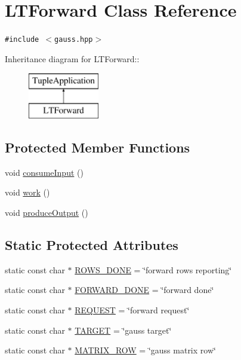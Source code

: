 \hypertarget{class_l_t_forward}{
\section{LTForward Class Reference}
\label{class_l_t_forward}
}
{\tt \#include $<$gauss.hpp$>$}

Inheritance diagram for LTForward::\begin{figure}[H]
\begin{center}
\leavevmode
\includegraphics[height=2cm]{class_l_t_forward}
\end{center}
\end{figure}
\subsection*{Protected Member Functions}
\begin{CompactItemize}
\item 
void \hyperlink{class_l_t_forward_6f3bbdf720e1899b0df8a8f222727086}{consumeInput} ()
\item 
void \hyperlink{class_l_t_forward_d98aff7a063bf6e8542046c6f2c097fa}{work} ()
\item 
void \hyperlink{class_l_t_forward_56c27cd419407319f95afa4e7d43409a}{produceOutput} ()
\end{CompactItemize}
\subsection*{Static Protected Attributes}
\begin{CompactItemize}
\item 
static const char $\ast$ \hyperlink{class_l_t_forward_52da5e0079361dc8daf8c6a9a976c98d}{ROWS\_\-DONE} = \char`\"{}forward rows reporting\char`\"{}
\item 
static const char $\ast$ \hyperlink{class_l_t_forward_f638f80e205c1c7dc14766015d1247e6}{FORWARD\_\-DONE} = \char`\"{}forward done\char`\"{}
\item 
static const char $\ast$ \hyperlink{class_l_t_forward_e5706fd083624c202c274015935c865b}{REQUEST} = \char`\"{}forward request\char`\"{}
\item 
static const char $\ast$ \hyperlink{class_l_t_forward_79ab5e95abdc47acc8150941a17fb54a}{TARGET} = \char`\"{}gauss target\char`\"{}
\item 
static const char $\ast$ \hyperlink{class_l_t_forward_31820d362b40c3d15df139fde2f871f2}{MATRIX\_\-ROW} = \char`\"{}gauss matrix row\char`\"{}
\end{CompactItemize}


